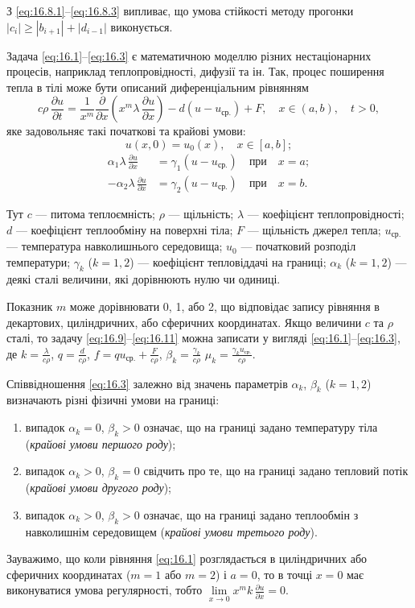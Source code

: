 \documentclass[12pt, a4paper]{article}
\renewcommand{\ge}{\geqslant}
\begin{document}
З \eqref{eq:16.8.1}--\eqref{eq:16.8.3} випливає, що умова стійкості методу прогонки $|c_i| \ge |b_{i + 1}| + |d_{i - 1}|$ виконується. \medskip

Задача \eqref{eq:16.1}--\eqref{eq:16.3} є математичною моделлю різних нестаціонарних процесів, наприклад теплопровідності, дифузії та ін. Так, процес поширення тепла в тілі може бути описаний диференціальним рівнянням
\begin{equation}
    \label{eq:16.9}
    c \rho \, \frac{\partial u}{\partial t} = \frac{1}{x^m} \frac{\partial}{\partial x} \left( x^m \lambda \, \frac{\partial u}{\partial x} \right) - d (u - u_{\text{ср.}}) + F, \quad x \in (a, b), \quad t > 0,
\end{equation}
яке задовольняє такі початкові та крайові умови:
\begin{equation}
    \label{eq:16.10}
    u(x, 0) = u_0(x), \quad x \in [a, b];
\end{equation}
\begin{equation}
    \label{eq:16.11}
    \begin{aligned}
        \alpha_1 \lambda \, \frac{\partial u}{\partial x} &= \gamma_1 (u - u_{\text{ср.}}) \quad \text{при} \quad x = a; \\
        -\alpha_2 \lambda \, \frac{\partial u}{\partial x} &= \gamma_2 (u - u_{\text{ср.}}) \quad \text{при} \quad x = b.
    \end{aligned}
\end{equation}

Тут $c$ --- питома теплоємність; $\rho$ --- щільність; $\lambda$ ---  коефіцієнт теплопровідності; $d$ --- коефіцієнт теплообміну на поверхні тіла; $F$ --- щільність джерел тепла; $ u_{\text{ср.}}$ --- температура навколишнього середовища; $u_0$ --- початковий розподіл температури; $\gamma_k$ ($k = 1, 2$) --- коефіцієнт тепловіддачі на границі; $\alpha_k$ ($k = 1, 2$) --- деякі сталі величини, які дорівнюють нулю чи одиниці. \medskip

Показник $m$ може дорівнювати 0, 1, або 2, що відповідає запису рівняння в декартових, циліндричних, або сферичних координатах. Якщо величини $c$ та $\rho$ сталі, то задачу \eqref{eq:16.9}--\eqref{eq:16.11} можна записати у вигляді \eqref{eq:16.1}--\eqref{eq:16.3}, де $k = \frac{\lambda}{c \rho}$, $q = \frac{d}{c \rho}$, $f = q u_{\text{ср.}} + \frac{F}{c \rho}$, $\beta_k = \frac{\gamma_k}{c \rho}$ $\mu_k = \frac{\gamma_k u_{\text{ср.}}}{c \rho}$. \medskip

Співвідношення \eqref{eq:16.3} залежно від значень параметрів $\alpha_k$, $\beta_k$ ($k = 1, 2$) визначають різні фізичні умови на границі:
\begin{enumerate}[label=\alph*)]
    \item випадок $\alpha_k = 0$, $\beta_k > 0$ означає, що на границі задано температуру тіла (\textit{крайові умови першого роду});
    \item випадок $\alpha_k > 0$, $\beta_k = 0$ свідчить про те, що на границі задано тепловий потік (\textit{крайові умови другого роду});
    \item випадок $\alpha_k > 0$, $\beta_k > 0$ означає, що на границі задано теплообмін з навколишнім середовищем (\textit{крайові умови третього роду}).
\end{enumerate}

Зауважимо, що коли рівняння \eqref{eq:16.1} розглядається в циліндричних або сферичних координатах ($m = 1$ або $m = 2$) і $a = 0$, то в точці $x = 0$ має виконуватися умова регулярності, тобто $\lim\limits_{x \to 0} x^m k \, \frac{\partial u}{\partial x} = 0$.
\end{document}
